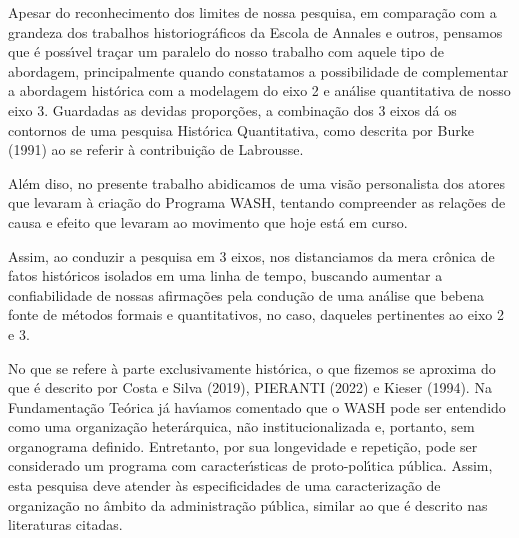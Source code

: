 \documentclass[
12pt,		%
openright,	%
twoside,  %
a4paper,			%
chapter=TITLE,		%
english,			%
french,				%
spanish,			%
brazil				%
]{USPSC-classe/USPSC}
\begin{document}
Apesar do reconhecimento dos limites de nossa pesquisa, em compara\c{c}\~ao com a grandeza dos trabalhos historiogr\'aficos da Escola de Annales e outros, pensamos que \'e poss\'{\i}vel tra\c{c}ar um paralelo do nosso trabalho com aquele tipo de abordagem, principalmente quando constatamos a possibilidade de complementar a abordagem hist\'orica com a modelagem do eixo 2 e an\'alise quantitativa de nosso eixo 3. Guardadas as devidas propor\c{c}\~oes, a combina\c{c}\~ao dos 3 eixos d\'a os contornos de uma pesquisa Hist\'orica Quantitativa, como descrita por  Burke (1991) ao se referir \`a contribui\c{c}\~ao de Labrousse.









Al\'em diso, no presente trabalho abidicamos de uma vis\~ao personalista dos atores que levaram \`a cria\c{c}\~ao do Programa WASH, tentando compreender as rela\c{c}\~oes de causa e efeito que levaram ao movimento que hoje est\'a em curso.









Assim, ao conduzir a pesquisa em 3 eixos, nos distanciamos da mera cr\^onica de fatos hist\'oricos isolados em uma linha de tempo, buscando aumentar a confiabilidade de nossas afirma\c{c}\~oes pela condu\c{c}\~ao de uma an\'alise que \textquotedbl bebe\textquotedbl  na fonte de m\'etodos formais e quantitativos, no caso, daqueles pertinentes ao eixo 2 e 3.









No que se refere \`a parte exclusivamente hist\'orica, o que fizemos se aproxima do que \'e descrito por   Costa e Silva (2019), PIERANTI (2022) e  Kieser (1994). Na Fundamenta\c{c}\~ao Te\'orica j\'a hav\'{\i}amos comentado que o WASH pode ser entendido como uma organiza\c{c}\~ao heter\'arquica, n\~ao institucionalizada e, portanto, sem organograma definido. Entretanto, por sua longevidade e repeti\c{c}\~ao, pode ser considerado um programa com caracter\'{\i}sticas de proto-pol\'{\i}tica p\'ublica. Assim, esta pesquisa deve atender \`as especificidades de uma caracteriza\c{c}\~ao de organiza\c{c}\~ao no \^ambito da administra\c{c}\~ao p\'ublica, similar ao que \'e descrito nas literaturas citadas.
\end{document}
